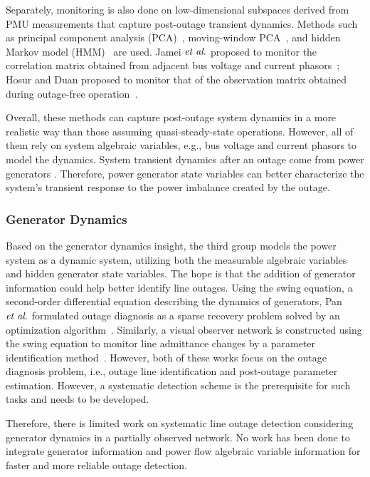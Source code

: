 Separately, monitoring is also done on low-dimensional subspaces derived from PMU measurements that capture post-outage transient dynamics. Methods such as principal component analysis (PCA)~\cite{Xie2014}, moving-window PCA~\cite{Rafferty2016}, and hidden Markov model (HMM)~\cite{Huang2016b} are used. Jamei $\textit{et al}.$ proposed to monitor the correlation matrix obtained from adjacent bus voltage and current phasors~\cite{Jamei2017a}; Hosur and Duan proposed to monitor that of the observation matrix obtained during outage-free operation~\cite{Hosur2019}. 

Overall, these methods can capture post-outage system dynamics in a more realistic way than those assuming quasi-steady-state operations. However, all of them rely on system algebraic variables, e.g., bus voltage and current phasors to model the dynamics. System transient dynamics after an outage come from power generators \cite{Glover2012}. Therefore, power generator state variables can better characterize the system's transient response to the power imbalance created by the outage.

\subsubsection{Generator Dynamics}
Based on the generator dynamics insight, the third group models the power system as a dynamic system, utilizing both the measurable algebraic variables and hidden generator state variables. The hope is that the addition of generator information could help better identify line outages. Using the swing equation, a second-order differential equation describing the dynamics of generators, Pan $\textit{et al}.$ formulated outage diagnosis as a sparse recovery problem solved by an optimization algorithm~\cite{Pan2015a}. Similarly, a visual observer network is constructed using the swing equation to monitor line admittance changes by a parameter identification method~\cite{Yang2016b}. However, both of these works focus on the outage diagnosis problem, i.e., outage line identification and post-outage parameter estimation. However, a systematic detection scheme is the prerequisite for such tasks and needs to be developed.

Therefore, there is limited work on systematic line outage detection  considering generator dynamics in a partially observed network. No work has been done to integrate generator information and power flow algebraic variable information for faster and more reliable outage detection.


